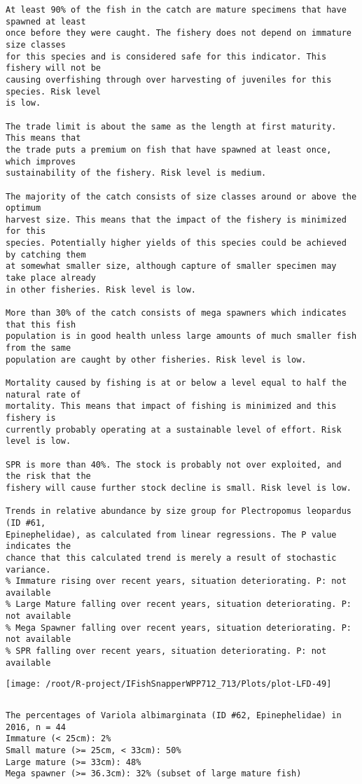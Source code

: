 \documentclass{report}\usepackage[]{graphicx}\usepackage[]{color}
\makeatletter
\def\maxwidth{ %
  \ifdim\Gin@nat@width>\linewidth
    \linewidth
  \else
    \Gin@nat@width
  \fi
}
\newenvironment{kframe}{%
 \def\at@end@of@kframe{}%
 \ifinner\ifhmode%
  \def\at@end@of@kframe{\end{minipage}}%
  \begin{minipage}{\columnwidth}%
 \fi\fi%
 \def\FrameCommand##1{\hskip\@totalleftmargin \hskip-\fboxsep
 \colorbox{shadecolor}{##1}\hskip-\fboxsep
     \hskip-\linewidth \hskip-\@totalleftmargin \hskip\columnwidth}%
 \MakeFramed {\advance\hsize-\width
   \@totalleftmargin\z@ \linewidth\hsize
   \@setminipage}}%
 {\par\unskip\endMakeFramed%
 \at@end@of@kframe}
\newenvironment{knitrout}{}{} %
\makeatother
\begin{document}
\begin{knitrout}
\begin{kframe}
\begin{verbatim}
At least 90% of the fish in the catch are mature specimens that have spawned at least
once before they were caught. The fishery does not depend on immature size classes
for this species and is considered safe for this indicator. This fishery will not be
causing overfishing through over harvesting of juveniles for this species. Risk level
is low.

The trade limit is about the same as the length at first maturity.  This means that
the trade puts a premium on fish that have spawned at least once, which improves
sustainability of the fishery. Risk level is medium.

The majority of the catch consists of size classes around or above the optimum
harvest size. This means that the impact of the fishery is minimized for this
species. Potentially higher yields of this species could be achieved by catching them
at somewhat smaller size, although capture of smaller specimen may take place already
in other fisheries. Risk level is low.

More than 30% of the catch consists of mega spawners which indicates that this fish
population is in good health unless large amounts of much smaller fish from the same
population are caught by other fisheries. Risk level is low.
 
Mortality caused by fishing is at or below a level equal to half the natural rate of
mortality. This means that impact of fishing is minimized and this fishery is
currently probably operating at a sustainable level of effort. Risk level is low.
 
SPR is more than 40%. The stock is probably not over exploited, and the risk that the
fishery will cause further stock decline is small. Risk level is low.
 
Trends in relative abundance by size group for Plectropomus leopardus (ID #61,
Epinephelidae), as calculated from linear regressions. The P value indicates the
chance that this calculated trend is merely a result of stochastic variance.
% Immature rising over recent years, situation deteriorating. P: not available
% Large Mature falling over recent years, situation deteriorating. P: not available
% Mega Spawner falling over recent years, situation deteriorating. P: not available
% SPR falling over recent years, situation deteriorating. P: not available
\end{verbatim}
\end{kframe}
\texttt{[image: /root/R-project/IFishSnapperWPP712\_713/Plots/plot-LFD-49]} 
\begin{kframe}\begin{verbatim}
\end{verbatim}
\end{kframe}
\clearpage
\newpage
\begin{kframe}\begin{verbatim}
The percentages of Variola albimarginata (ID #62, Epinephelidae) in 2016, n = 44
Immature (< 25cm): 2%
Small mature (>= 25cm, < 33cm): 50%
Large mature (>= 33cm): 48%
Mega spawner (>= 36.3cm): 32% (subset of large mature fish)
 

\end{verbatim}
\end{kframe}
\end{knitrout}
\end{document}
